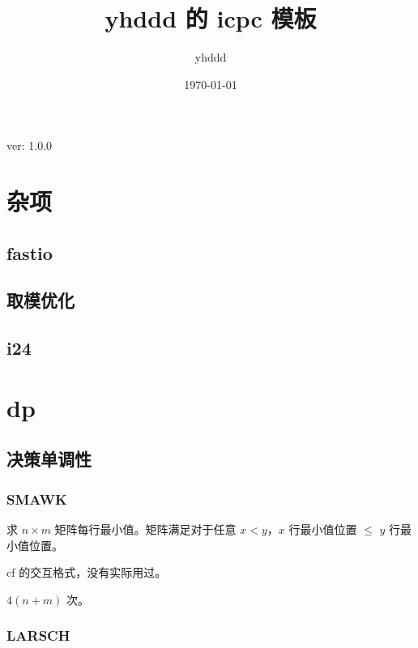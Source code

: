 \documentclass[12pt]{ctexart}
\title{yhddd 的 icpc 模板}
\author{yhddd}
\date{\today}
\begin{document}
\maketitle

\centerline{ver: 1.0.0}

\newpage

\tableofcontents

\newpage

\section{杂项}

\subsection{fastio}



\subsection{取模优化}

\subsection{i24}

\newpage

\section{dp}

\subsection{决策单调性}

\subsubsection{SMAWK}

求 $n\times m$ 矩阵每行最小值。矩阵满足对于任意 $x<y$，$x$ 行最小值位置 $\le$ $y$ 行最小值位置。

cf 的交互格式，没有实际用过。

$4(n+m)$ 次。



\subsubsection{LARSCH}
\end{document}
